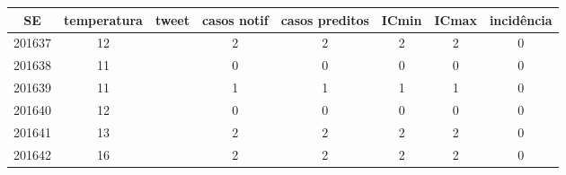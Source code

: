 \begin{tabular}{c|ccccccc}
  \hline
SE & temperatura & tweet & casos notif & casos preditos & ICmin & ICmax & incidência \\ 
  \hline
201637 & 12 &  & 2 & 2 & 2 & 2 & 0 \\ 
  201638 & 11 &  & 0 & 0 & 0 & 0 & 0 \\ 
  201639 & 11 &  & 1 & 1 & 1 & 1 & 0 \\ 
  201640 & 12 &  & 0 & 0 & 0 & 0 & 0 \\ 
  201641 & 13 &  & 2 & 2 & 2 & 2 & 0 \\ 
  201642 & 16 &  & 2 & 2 & 2 & 2 & 0 \\ 
   \hline
\end{tabular}
